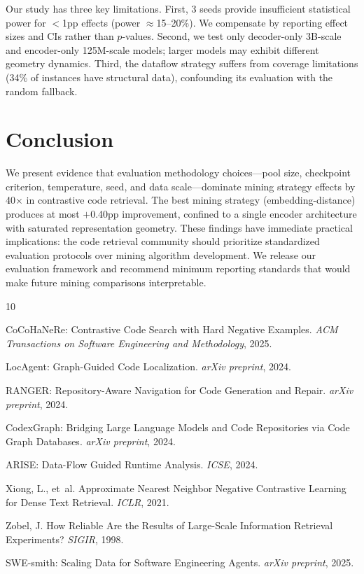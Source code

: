 \documentclass[11pt]{article}
\begin{document}
Our study has three key limitations. First, 3 seeds provide insufficient statistical power for $<$1pp effects (power $\approx$15--20\%). We compensate by reporting effect sizes and CIs rather than $p$-values. Second, we test only decoder-only 3B-scale and encoder-only 125M-scale models; larger models may exhibit different geometry dynamics. Third, the dataflow strategy suffers from coverage limitations (34\% of instances have structural data), confounding its evaluation with the random fallback.

\section{Conclusion}

We present evidence that evaluation methodology choices---pool size, checkpoint criterion, temperature, seed, and data scale---dominate mining strategy effects by 40$\times$ in contrastive code retrieval. The best mining strategy (embedding-distance) produces at most $+$0.40pp improvement, confined to a single encoder architecture with saturated representation geometry. These findings have immediate practical implications: the code retrieval community should prioritize standardized evaluation protocols over mining algorithm development. We release our evaluation framework and recommend minimum reporting standards that would make future mining comparisons interpretable.


\begin{thebibliography}{10}

CoCoHaNeRe: Contrastive Code Search with Hard Negative Examples.
\newblock \emph{ACM Transactions on Software Engineering and Methodology}, 2025.

LocAgent: Graph-Guided Code Localization.
\newblock \emph{arXiv preprint}, 2024.

RANGER: Repository-Aware Navigation for Code Generation and Repair.
\newblock \emph{arXiv preprint}, 2024.

CodexGraph: Bridging Large Language Models and Code Repositories via Code Graph Databases.
\newblock \emph{arXiv preprint}, 2024.

ARISE: Data-Flow Guided Runtime Analysis.
\newblock \emph{ICSE}, 2024.

Xiong, L., et~al.
\newblock Approximate Nearest Neighbor Negative Contrastive Learning for Dense Text Retrieval.
\newblock \emph{ICLR}, 2021.

Zobel, J.
\newblock How Reliable Are the Results of Large-Scale Information Retrieval Experiments?
\newblock \emph{SIGIR}, 1998.

SWE-smith: Scaling Data for Software Engineering Agents.
\newblock \emph{arXiv preprint}, 2025.

\end{thebibliography}
\end{document}

